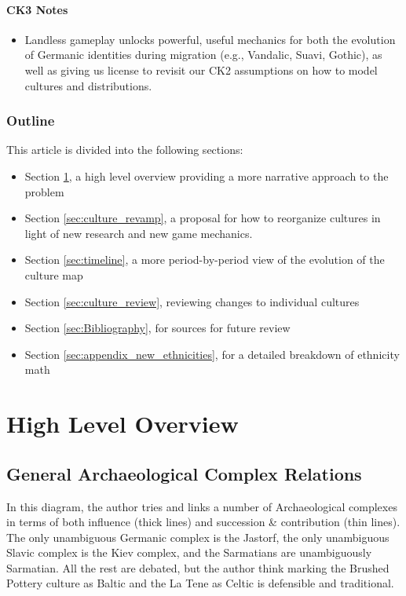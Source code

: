 \documentclass{article}
\begin{document}
	\paragraph{CK3 Notes}
	\begin{itemize}
		\item Landless gameplay unlocks powerful, useful mechanics for both the evolution of Germanic identities during migration (e.g., Vandalic, Suavi, Gothic), as well as giving us license to revisit our CK2 assumptions on how to model cultures and distributions.
	\end{itemize}
	
	\subsubsection{Outline}
	This article is divided into the following sections:
	
	\begin{itemize}
		\item Section \ref{sec:high_level_overview}, a high level overview providing a more narrative approach to the problem
		\item Section \ref{sec:culture_revamp}, a proposal for how to reorganize cultures in light of new research and new game mechanics.
		\item Section \ref{sec:timeline}, a more period-by-period view of the evolution of the culture map
		\item Section \ref{sec:culture_review}, reviewing changes to individual cultures
		\item Section \ref{sec:Bibliography}, for sources for future review
		\item Section \ref{sec:appendix_new_ethnicities}, for a detailed breakdown of ethnicity math
	\end{itemize}
	
	\section{High Level Overview}
	\label{sec:high_level_overview}
	
	\subsection{General Archaeological Complex Relations}
	In this diagram, the author tries and links a number of Archaeological complexes in terms of both influence (thick lines) and succession \& contribution (thin lines).
	The only unambiguous Germanic complex is the Jastorf,  the only unambiguous Slavic complex is the Kiev complex, and the Sarmatians are unambiguously Sarmatian.
	All the rest are debated, but the author think marking the Brushed Pottery culture as Baltic and the La Tene as Celtic is defensible and traditional.
	
\end{document}
